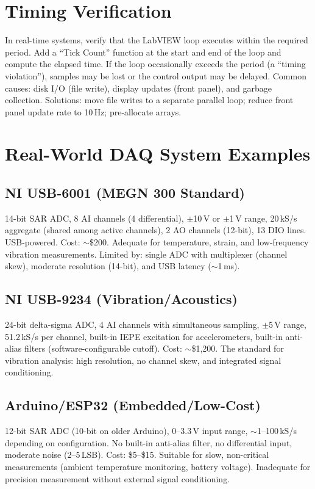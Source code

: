 \documentclass[11pt,letterpaper,twoside,openany]{book}
\begin{document}
\section{Timing Verification}
In real-time systems, verify that the LabVIEW loop executes within the required period. Add a ``Tick Count'' function at the start and end of the loop and compute the elapsed time. If the loop occasionally exceeds the period (a ``timing violation''), samples may be lost or the control output may be delayed. Common causes: disk I/O (file write), display updates (front panel), and garbage collection. Solutions: move file writes to a separate parallel loop; reduce front panel update rate to 10\,Hz; pre-allocate arrays.
\section{Real-World DAQ System Examples}
\subsection{NI USB-6001 (MEGN 300 Standard)}
14-bit SAR ADC, 8 AI channels (4 differential), $\pm$10\,V or $\pm$1\,V range, 20\,kS/s aggregate (shared among active channels), 2 AO channels (12-bit), 13 DIO lines. USB-powered. Cost: $\sim$\$200. Adequate for temperature, strain, and low-frequency vibration measurements. Limited by: single ADC with multiplexer (channel skew), moderate resolution (14-bit), and USB latency ($\sim$1\,ms).

\subsection{NI USB-9234 (Vibration/Acoustics)}
24-bit delta-sigma ADC, 4 AI channels with simultaneous sampling, $\pm$5\,V range, 51.2\,kS/s per channel, built-in IEPE excitation for accelerometers, built-in anti-alias filters (software-configurable cutoff). Cost: $\sim$\$1{,}200. The standard for vibration analysis: high resolution, no channel skew, and integrated signal conditioning.

\subsection{Arduino/ESP32 (Embedded/Low-Cost)}
12-bit SAR ADC (10-bit on older Arduino), 0--3.3\,V input range, $\sim$1--100\,kS/s depending on configuration. No built-in anti-alias filter, no differential input, moderate noise (2--5\,LSB). Cost: \$5--\$15. Suitable for slow, non-critical measurements (ambient temperature monitoring, battery voltage). Inadequate for precision measurement without external signal conditioning.
\end{document}
